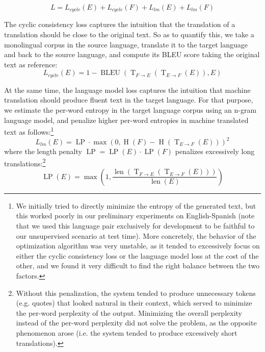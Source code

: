 \documentclass[11pt,a4paper]{article}
\DeclareMathOperator{\length}{len}
\DeclareMathOperator{\bleu}{BLEU}
\DeclareMathOperator{\translate}{T}
\DeclareMathOperator{\entropy}{H}
\DeclareMathOperator{\lenpenalty}{LP}
\begin{document}
\[L = L_{cycle}(E) + L_{cycle}(F) + L_{lm}(E) + L_{lm}(F)\]

The cyclic consistency loss captures the intuition that the translation of a translation should be close to the original text. So as to quantify this, we take a monolingual corpus in the source language, translate it to the target language and back to the source language, and compute its BLEU score taking the original text as reference:
\[L_{cycle}(E) = 1 - \bleu (\translate_{F \rightarrow E} ( \translate_{E \rightarrow F} (E)), E) \]

At the same time, the language model loss captures the intuition that machine translation should produce fluent text in the target language. For that purpose, we estimate the per-word entropy in the target language corpus using an n-gram language model, and penalize higher per-word entropies in machine translated text as follows:\footnote{We initially tried to directly minimize the entropy of the generated text, but this worked poorly in our preliminary experiments on English-Spanish (note that we used this language pair exclusively for development to be faithful to our unsupervised scenario at test time). More concretely, the behavior of the optimization algorithm was very unstable, as it tended to excessively focus on either the cyclic consistency loss or the language model loss at the cost of the other, and we found it very difficult to find the right balance between the two factors.}
\[L_{lm}(E) = \lenpenalty \cdot \max (0, \entropy (F) - \entropy (\translate_{E \rightarrow F} (E)) ) ^2 \]
where the length penalty $\lenpenalty = \lenpenalty (E) \cdot \lenpenalty (F)$ penalizes excessively long translations:\footnote{Without this penalization, the system tended to produce unnecessary tokens (e.g. quotes) that looked natural in their context, which served to minimize the per-word perplexity of the output. Minimizing the overall perplexity instead of the per-word perplexity did not solve the problem, as the opposite phenomenon arose (i.e. the system tended to produce excessively short translations).}
\[ \lenpenalty (E) = \max \left( 1, \frac{\length (\translate_{F \rightarrow E} ( \translate_{E \rightarrow F} (E)))}{\length (E)} \right) \]
\end{document}
